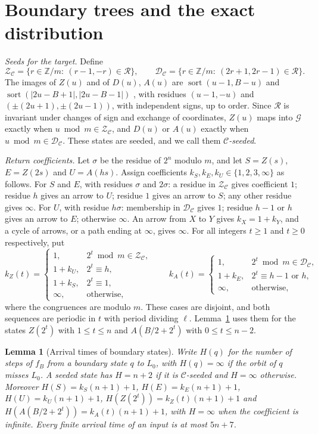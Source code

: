 \documentclass[11pt]{amsart}
\newtheorem{lemma}[theorem]{Lemma}
\theoremstyle{remark}
\DeclareMathOperator{\sort}{sort}
\newcommand{\C}{\mathcal{C}}
\newcommand{\R}{\mathcal{R}}
\newcommand{\G}{\mathcal{G}}
\newcommand{\Zs}{\mathcal{Z}}
\newcommand{\Ds}{\mathcal{D}}
\begin{document}
\section{Boundary trees and the exact distribution}\label{sec:trees}

\emph{Seeds for the target.} Define
\[
\Zs_\C=\{r\in\mathbb Z/m:\ (r-1,-r)\in\R\},\qquad
\Ds_\C=\{r\in\mathbb Z/m:\ (2r+1,2r-1)\in\R\}.
\]
The images of $Z(u)$ and of $D(u)$, $A(u)$ are $\sort(u-1,B-u)$ and $\sort(|2u-B+1|,|2u-B-1|)$ \cite[(1)]{G1}, with residues $(u-1,-u)$ and $(\pm(2u+1),\pm(2u-1))$, with independent signs, up to order. Since $\R$ is invariant under changes of sign and exchange of coordinates, $Z(u)$ maps into $\G$ exactly when $u\bmod m\in\Zs_\C$, and $D(u)$ or $A(u)$ exactly when $u\bmod m\in\Ds_\C$. These states are seeded, and we call them \emph{$\C$-seeded}.

\emph{Return coefficients.} Let $\sigma$ be the residue of $2^n$ modulo $m$, and let $S=Z(s)$, $E=Z(2s)$ and $U=A(hs)$. Assign coefficients $k_S,k_E,k_U\in\{1,2,3,\infty\}$ as follows. For $S$ and $E$, with residues $\sigma$ and $2\sigma$: a residue in $\Zs_\C$ gives coefficient $1$; residue $h$ gives an arrow to $U$; residue $1$ gives an arrow to $S$; any other residue gives $\infty$. For $U$, with residue $h\sigma$: membership in $\Ds_\C$ gives $1$; residue $h-1$ or $h$ gives an arrow to $E$; otherwise $\infty$. An arrow from $X$ to $Y$ gives $k_X=1+k_Y$, and a cycle of arrows, or a path ending at $\infty$, gives $\infty$. For all integers $t\ge1$ and $t\ge0$ respectively, put
\[
k_Z(t)=\begin{cases}1,&2^t\bmod m\in\Zs_\C,\\1+k_U,&2^t\equiv h,\\1+k_S,&2^t\equiv1,\\\infty,&\text{otherwise},\end{cases}\qquad
k_A(t)=\begin{cases}1,&2^t\bmod m\in\Ds_\C,\\1+k_E,&2^t\equiv h-1\text{ or }h,\\\infty,&\text{otherwise},\end{cases}
\]
where the congruences are modulo $m$. These cases are disjoint, and both sequences are periodic in $t$ with period dividing $\ell$. Lemma~\ref{lem:H} uses them for the states $Z(2^t)$ with $1\le t\le n$ and $A(B/2+2^t)$ with $0\le t\le n-2$.

\begin{lemma}[Arrival times of boundary states]\label{lem:H}
Write $H(q)$ for the number of steps of $f_B$ from a boundary state $q$ to $L_0$, with $H(q)=\infty$ if the orbit of $q$ misses $L_0$. A seeded state has $H=n+2$ if it is $\C$-seeded and $H=\infty$ otherwise. Moreover $H(S)=k_S(n+1)+1$, $H(E)=k_E(n+1)+1$, $H(U)=k_U(n+1)+1$, $H(Z(2^t))=k_Z(t)(n+1)+1$ and $H(A(B/2+2^t))=k_A(t)(n+1)+1$, with $H=\infty$ when the coefficient is infinite. Every finite arrival time of an input is at most $5n+7$.
\end{lemma}
\end{document}
